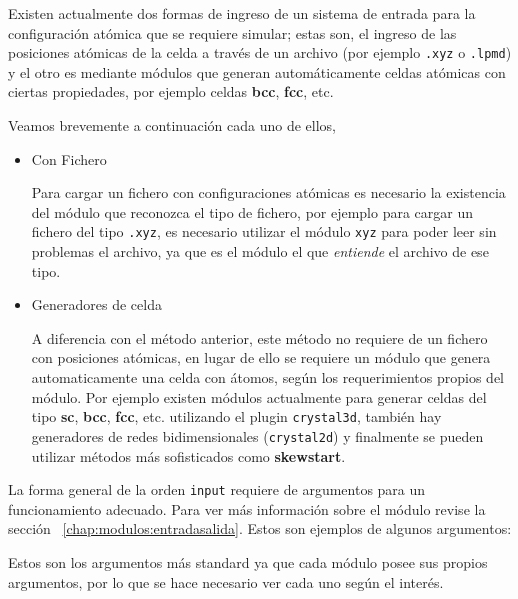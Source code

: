 Existen actualmente dos formas de ingreso de un sistema de entrada para la
configuraci\'on at\'omica que se requiere simular; estas son, el ingreso de las
posiciones at\'omicas de la celda a trav\'es de un archivo (por ejemplo
\verb|.xyz| o \verb|.lpmd|) y el otro es mediante m\'odulos que generan
autom\'aticamente celdas at\'omicas con ciertas propiedades, por ejemplo celdas
\textbf{bcc}, \textbf{fcc}, etc.

Veamos brevemente a continuaci\'on cada uno de ellos,

\begin{itemize}
 \item{Con Fichero}

Para cargar un fichero con configuraciones at\'omicas es necesario la existencia
del m\'odulo que reconozca el tipo de fichero, por ejemplo para cargar un
fichero del tipo \verb|.xyz|, es necesario utilizar el m\'odulo \verb|xyz| para
poder leer sin problemas el archivo, ya que es el m\'odulo el que
\textit{entiende} el archivo de ese tipo. 
  \item{Generadores de celda}

A diferencia con el m\'etodo anterior, este m\'etodo no requiere de un fichero
con posiciones at\'omicas, en lugar de ello se requiere un m\'odulo que genera
automaticamente una celda con \'atomos, seg\'un los requerimientos propios del
m\'odulo. Por ejemplo existen m\'odulos actualmente para generar celdas del tipo
\textbf{sc}, \textbf{bcc}, \textbf{fcc}, etc. utilizando el plugin
\verb|crystal3d|, tambi\'en hay generadores de redes bidimensionales
(\verb|crystal2d|) y finalmente se pueden utilizar m\'etodos m\'as sofisticados
como \textbf{skewstart}.

\end{itemize}

La forma general de la orden \verb|input| requiere de argumentos para un
funcionamiento adecuado. Para ver m\'as informaci\'on sobre el m\'odulo revise
la secci\'on ~\ref{chap:modulos:entradasalida}. Estos son ejemplos de algunos
argumentos:


Estos son los argumentos m\'as standard ya que cada m\'odulo posee sus propios
argumentos, por lo que se hace necesario ver cada uno seg\'un el inter\'es.

